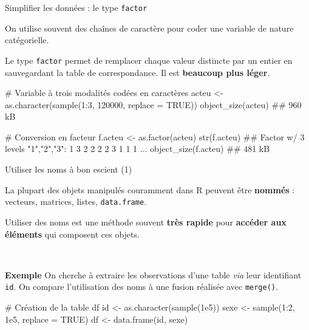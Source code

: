 \documentclass[12pt,handout,ignorenonframetext,]{beamer}
\newenvironment{Shaded}{}{}
\newcommand{\KeywordTok}[1]{\textcolor[rgb]{0.00,0.00,1.00}{{#1}}}
\newcommand{\DataTypeTok}[1]{{#1}}
\newcommand{\DecValTok}[1]{{#1}}
\newcommand{\FloatTok}[1]{{#1}}
\newcommand{\StringTok}[1]{\textcolor[rgb]{0.00,0.50,0.50}{{#1}}}
\newcommand{\CommentTok}[1]{\textcolor[rgb]{0.00,0.50,0.00}{{#1}}}
\newcommand{\OtherTok}[1]{\textcolor[rgb]{1.00,0.25,0.00}{{#1}}}
\newcommand{\NormalTok}[1]{{#1}}
\renewenvironment{Shaded}{\begin{snugshade}}{\end{snugshade}}
\begin{document}
\begin{frame}[fragile]{Simplifier les données : le type \texttt{factor}}

On utilise souvent des chaînes de caractère pour coder une variable de
nature catégorielle.

Le type \texttt{factor} permet de remplacer chaque valeur distincte par
un entier en sauvegardant la table de correspondance. Il est
\textbf{beaucoup plus léger}.

\pause \footnotesize

\begin{Shaded}
\begin{Highlighting}[]
\CommentTok{# Variable à trois modalités codées en caractères}
\NormalTok{acteu <-}\StringTok{ }\KeywordTok{as.character}\NormalTok{(}\KeywordTok{sample}\NormalTok{(}\DecValTok{1}\NormalTok{:}\DecValTok{3}\NormalTok{, }\DecValTok{120000}\NormalTok{, }\DataTypeTok{replace =} \OtherTok{TRUE}\NormalTok{))}
\KeywordTok{object_size}\NormalTok{(acteu)}
  \NormalTok{## 960 kB}

\CommentTok{# Conversion en facteur}
\NormalTok{f.acteu <-}\StringTok{ }\KeywordTok{as.factor}\NormalTok{(acteu)}
\KeywordTok{str}\NormalTok{(f.acteu)}
  \NormalTok{##  Factor w/ 3 levels "1","2","3": 1 3 2 2 2 2 3 1 1 1 ...}
\KeywordTok{object_size}\NormalTok{(f.acteu)}
  \NormalTok{## 481 kB}
\end{Highlighting}
\end{Shaded}

\end{frame}

\begin{frame}[fragile]{Utiliser les noms à bon escient (1)}

La plupart des objets manipulés couramment dans R peuvent être
\textbf{nommés} : vecteurs, matrices, listes, \texttt{data.frame}.

Utiliser des noms est une méthode souvent \textbf{très rapide} pour
\textbf{accéder aux éléments} qui composent ces objets.

~

\pause 

\textbf{Exemple} On cherche à extraire les observations d'une table
\emph{via} leur identifiant \texttt{id}. On compare l'utilisation des
noms à une fusion réalisée avec \texttt{merge()}.

\small 

\begin{Shaded}
\begin{Highlighting}[]
\CommentTok{# Création de la table df}
\NormalTok{id <-}\StringTok{ }\KeywordTok{as.character}\NormalTok{(}\KeywordTok{sample}\NormalTok{(}\FloatTok{1e5}\NormalTok{))}
\NormalTok{sexe <-}\StringTok{ }\KeywordTok{sample}\NormalTok{(}\DecValTok{1}\NormalTok{:}\DecValTok{2}\NormalTok{, }\FloatTok{1e5}\NormalTok{, }\DataTypeTok{replace =} \OtherTok{TRUE}\NormalTok{)}
\NormalTok{df <-}\StringTok{ }\KeywordTok{data.frame}\NormalTok{(id, sexe)}
\end{Highlighting}
\end{Shaded}

\end{frame}
\end{document}
